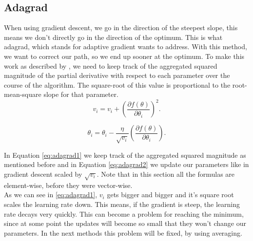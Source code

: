 \documentclass[aodsor,preprint]{imsart}
\numberwithin{equation}{section}
\theoremstyle{plain}
\begin{document}
\subsection{Adagrad}\label{adagrad}
When using gradient descent, we go in the direction of the steepest slope, this means we don't directly go in the direction of the optimum. This is what adagrad, which stands for adaptive gradient wants to address. With this method, we want to correct our path, so we end up sooner at the optimum. To make this work as described by \cite{Aggarwal18}, we need to keep track of the aggregated squared magnitude of the partial derivative with respect to each parameter over the course of the algorithm. The square-root of this value is proportional to the root-mean-square slope for that parameter.
\begin{equation} \label{eq:adagrad1}
v_{i} = v_{i} + \left(\frac{\partial f(\theta)}{\partial \theta_{i}}\right)^2.
\end{equation}

\begin{equation} \label{eq:adagrad2}
\theta_{i} = \theta_{i} - \frac{\eta}{\sqrt{v_{i}}} \left(\frac{\partial f(\theta)}{\partial \theta_{i}} \right).
\end{equation}

In Equation \ref{eq:adagrad1} we keep track of the aggregated squared magnitude as mentioned before and in Equation \ref{eq:adagrad2} we update our parameters like in gradient descent scaled by $\sqrt{v_{i}}$. Note that in this section all the formulas are element-wise, before they were vector-wise. \\
As we can see in \ref{eq:adagrad1}, $v_{i}$ gets bigger and bigger and it's square root scales the learning rate down. This means, if the gradient is steep, the learning rate decays very quickly. This can become a problem for reaching the minimum, since at some point the updates will become so small that they won't change our parameters. In the next methods this problem will be fixed, by using averaging.
\end{document}
